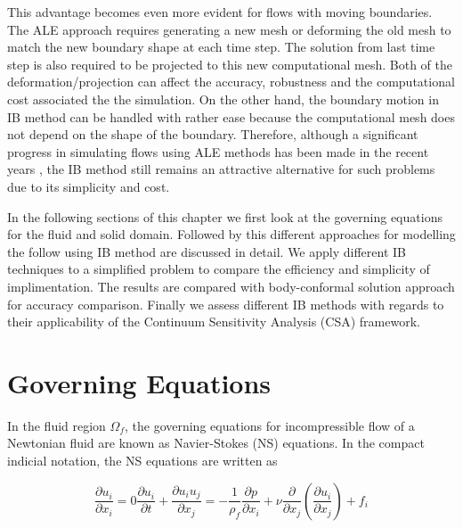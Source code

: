This advantage becomes even more evident for flows with moving boundaries. The ALE approach requires generating a new mesh or deforming the old mesh to match the new boundary shape at each time step. The solution from last time step is also required to be projected to this new computational mesh. Both of the deformation/projection can affect the accuracy, robustness and the computational cost associated the the simulation. On the other hand, the boundary motion in IB method can be handled with rather ease because the computational mesh does not depend on the shape of the boundary. Therefore, although a significant progress in simulating flows using ALE methods has been made in the recent years \cite{lomtev1999discontinuous, farhat2004cfd, cheng2005fluid}, the IB method still remains an attractive alternative for such problems due to its simplicity and cost.

In the following sections of this chapter we first look at the governing equations for the fluid and solid domain. Followed by this different approaches for modelling the follow using IB method are discussed in detail. We apply different IB techniques to a simplified problem to compare the efficiency and simplicity of implimentation. The results are compared with body-conformal solution approach for accuracy comparison. Finally we assess different IB methods with regards to their applicability of the Continuum Sensitivity Analysis (CSA) framework.

\section{Governing Equations}
In the fluid region $\Omega_f$, the governing equations for incompressible flow of a Newtonian fluid are known as Navier-Stokes (NS) equations. In the compact indicial notation, the NS equations are written as

\begin{subequations}\label{eq:C3_GE}
\begin{equation}\label{eq:C3_continuity}
	\frac{\partial u_i}{\partial x_i} = 0
\end{equation}
\begin{equation}\label{eq:C3_momentum}
	\frac{\partial u_i}{\partial t} + \frac{\partial u_i u_j}{\partial x_j} = 
	-\frac{1}{\rho_f	} \frac{\partial p}{\partial x_i} + 
	\nu \frac{\partial}{\partial x_j} \left( \frac{\partial u_i}{\partial x_j} \right) + 
	f_i
\end{equation}
\end{subequations}

